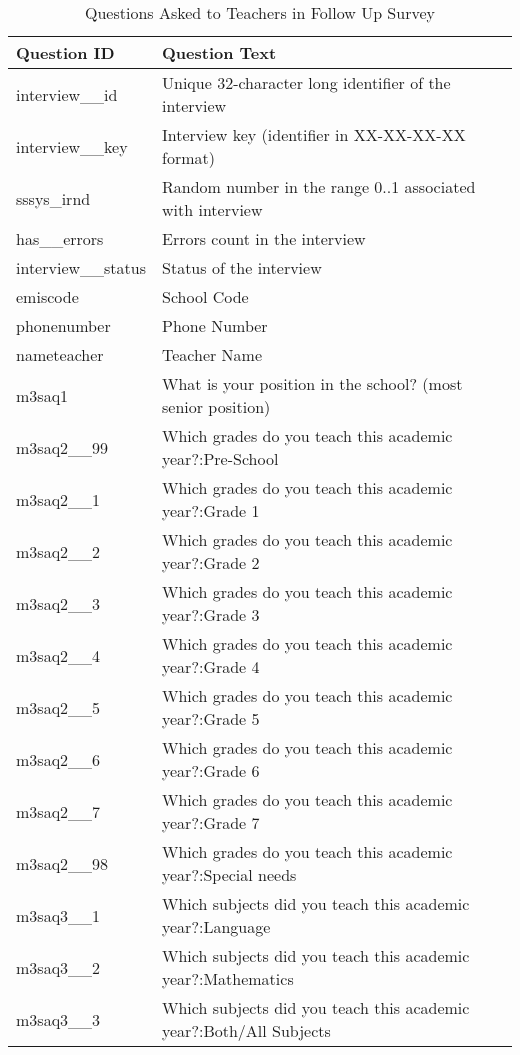 \documentclass[
]{article}
\begin{document}
\begin{table}

\caption{\label{tab:questions}Questions Asked to Teachers in Follow Up Survey}
\centering
\begin{tabular}[t]{l|l}
\hline
Question ID & Question Text\\
\hline
interview\_\_id & Unique 32-character long identifier of the interview\\
\hline
interview\_\_key & Interview key (identifier in XX-XX-XX-XX format)\\
\hline
sssys\_irnd & Random number in the range 0..1 associated with interview\\
\hline
has\_\_errors & Errors count in the interview\\
\hline
interview\_\_status & Status of the interview\\
\hline
emiscode & School Code\\
\hline
phonenumber & Phone Number\\
\hline
nameteacher & Teacher Name\\
\hline
m3saq1 & What is your position in the school?  (most senior position)\\
\hline
m3saq2\_\_99 & Which grades do you teach this academic year?:Pre-School\\
\hline
m3saq2\_\_1 & Which grades do you teach this academic year?:Grade 1\\
\hline
m3saq2\_\_2 & Which grades do you teach this academic year?:Grade 2\\
\hline
m3saq2\_\_3 & Which grades do you teach this academic year?:Grade 3\\
\hline
m3saq2\_\_4 & Which grades do you teach this academic year?:Grade 4\\
\hline
m3saq2\_\_5 & Which grades do you teach this academic year?:Grade 5\\
\hline
m3saq2\_\_6 & Which grades do you teach this academic year?:Grade 6\\
\hline
m3saq2\_\_7 & Which grades do you teach this academic year?:Grade 7\\
\hline
m3saq2\_\_98 & Which grades do you teach this academic year?:Special needs\\
\hline
m3saq3\_\_1 & Which subjects did you teach this academic year?:Language\\
\hline
m3saq3\_\_2 & Which subjects did you teach this academic year?:Mathematics\\
\hline
m3saq3\_\_3 & Which subjects did you teach this academic year?:Both/All Subjects\\

\end{tabular}
\end{table}
\end{document}
